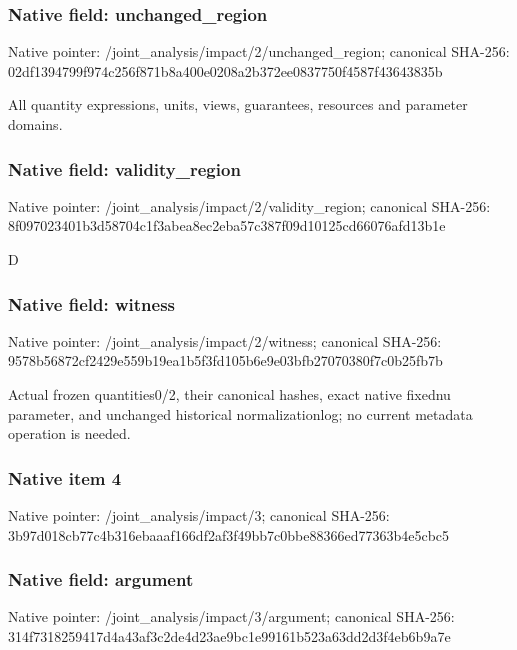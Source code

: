 \documentclass[10pt,a4paper]{article}
\begin{document}
\subsubsection{Native field: unchanged\_\allowbreak{}region}
Native pointer: /joint\_\allowbreak{}analysis/impact/2/unchanged\_\allowbreak{}region; canonical SHA-256: 02df1394799f974c256f871b8a400e0208a2b372ee0837750f4587f43643835b

\begingroup\raggedright\sloppy All quantity expressions,\allowbreak{} units,\allowbreak{} views,\allowbreak{} guarantees,\allowbreak{} resources and parameter domains.\par\endgroup

\subsubsection{Native field: validity\_\allowbreak{}region}
Native pointer: /joint\_\allowbreak{}analysis/impact/2/validity\_\allowbreak{}region; canonical SHA-256: 8f097023401b3d58704c1f3abea8ec2eba57c387f09d10125cd66076afd13b1e

\begingroup\raggedright\sloppy D\par\endgroup

\subsubsection{Native field: witness}
Native pointer: /joint\_\allowbreak{}analysis/impact/2/witness; canonical SHA-256: 9578b56872cf2429e559b19ea1b5f3fd105b6e9e03bfb27070380f7c0b25fb7b

\begingroup\raggedright\sloppy Actual frozen quantities0/\allowbreak{}2,\allowbreak{} their canonical hashes,\allowbreak{} exact native fixednu parameter,\allowbreak{} and unchanged historical normalizationlog;\allowbreak{} no current metadata operation is needed.\par\endgroup

\subsubsection{Native item 4}
Native pointer: /joint\_\allowbreak{}analysis/impact/3; canonical SHA-256: 3b97d018cb77c4b316ebaaaf166df2af3f49bb7c0bbe88366ed77363b4e5cbc5

\subsubsection{Native field: argument}
Native pointer: /joint\_\allowbreak{}analysis/impact/3/argument; canonical SHA-256: 314f7318259417d4a43af3c2de4d23ae9bc1e99161b523a63dd2d3f4eb6b9a7e
\end{document}
